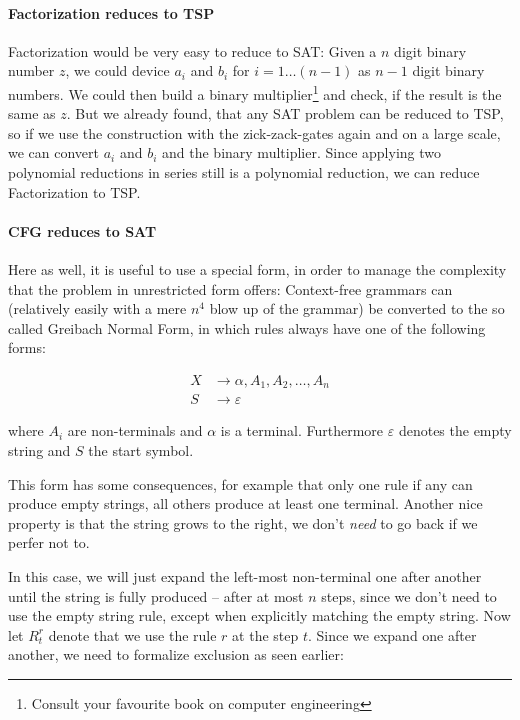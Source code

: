 \paragraph{Factorization reduces to TSP}
Factorization would be very easy to reduce to SAT: Given a $n$ digit binary 
number $z$, we could device $a_i$ and $b_i$ for $i=1\ldots (n-1)$ as $n-1$ digit 
binary numbers. We could then build a binary multiplier\footnote{Consult your 
favourite book on computer engineering} and check, if the result is the same 
as $z$. But we already found, that any SAT problem can be reduced to TSP, so 
if we use the construction with the zick-zack-gates again and on a large 
scale, we can convert $a_i$ and $b_i$ and the binary multiplier. Since 
applying two polynomial reductions in series still is a polynomial reduction, 
we can reduce Factorization to TSP. 

\paragraph{CFG reduces to SAT}
Here as well, it is useful to use a special form, in order to manage the 
complexity that the problem in unrestricted form offers: Context-free 
grammars can (relatively easily with a mere $n^4$ blow up of the grammar) be
converted to the so called Greibach Normal Form, in which rules always have one
of the following forms:

\begin{align*}
	X &\rightarrow \alpha, A_1, A_2, \ldots, A_n \\
	S &\rightarrow \varepsilon
\end{align*}

where $A_i$ are non-terminals and $\alpha$ is a terminal. Furthermore $\varepsilon$ 
denotes the empty string and $S$ the start symbol.

This form has some consequences, for example that only one rule if any can 
produce empty strings, all others produce at least one terminal. Another nice 
property is that the string grows to the right, we don't \emph{need} to go 
back if we perfer not to.

In this case, we will just expand the left-most non-terminal one after 
another until the string is fully produced -- after at most $n$ steps, since 
we don't need to use the empty string rule, except when explicitly matching 
the empty string. Now let $R_t^r$ denote that we use the rule $r$ at the step $t$.
Since we expand one after another, we need to formalize exclusion as seen earlier:

